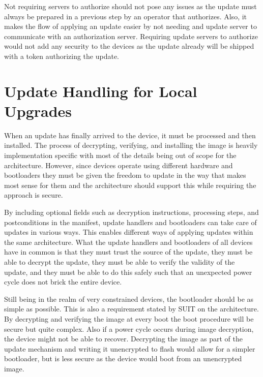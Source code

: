 \documentclass[0-thesis.tex]{subfiles}
\begin{document}
Not requiring servers to authorize should not pose any issues as the update must always be
prepared in a previous step by an operator that authorizes. Also, it makes the flow of
applying an update easier by not needing and update server to communicate with an
authorization server. Requiring update servers to authorize would not add any security to
the devices as the update already will be shipped with a token authorizing the update.

\section{Update Handling for Local Upgrades}
\label{sec:upgrading}
When an update has finally arrived to the device, it must be processed and then installed.
The process of decrypting, verifying, and installing the image is heavily implementation
specific with most of the details being out of scope for the architecture. However, since
devices operate using different hardware and bootloaders they must be given the freedom to
update in the way that makes most sense for them and the architecture should support this
while requiring the approach is secure.

By including optional fields such as decryption instructions, processing steps, and
postconditions in the manifest, update handlers and bootloaders can take care of updates
in various ways. This enables different ways of applying updates within the same
architecture. What the update handlers and bootloaders of all devices have in common is
that they must trust the source of the update, they must be able to decrypt the update,
they must be able to verify the validity of the update, and they must be able to do this
safely such that an unexpected power cycle does not brick the entire device.

Still being in the realm of very constrained devices, the bootloader should be as simple
as possible. This is also a requirement stated by SUIT on the architecture. By decrypting
and verifying the image at every boot the boot procedure will be secure but quite complex.
Also if a power cycle occurs during image decryption, the device might not be able to
recover. Decrypting the image as part of the update mechanism and writing it unencrypted
to flash would allow for a simpler bootloader, but is less secure as the device would boot
from an unencrypted image.
\end{document}
